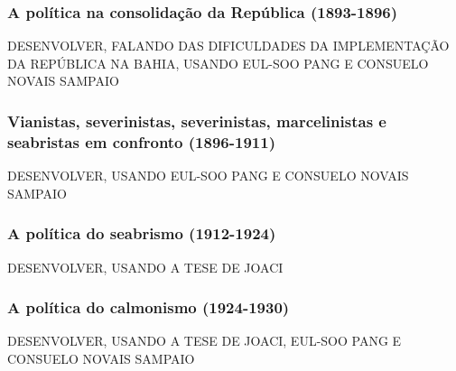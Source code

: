 \subsubsection{A política na consolidação da República (1893-1896)}

DESENVOLVER, FALANDO DAS DIFICULDADES DA IMPLEMENTAÇÃO DA REPÚBLICA NA BAHIA, USANDO EUL-SOO PANG E CONSUELO NOVAIS SAMPAIO

\subsubsection{Vianistas, severinistas, severinistas, marcelinistas e seabristas em confronto (1896-1911)}

DESENVOLVER, USANDO EUL-SOO PANG E CONSUELO NOVAIS SAMPAIO

\subsubsection{A política do seabrismo (1912-1924)}

DESENVOLVER, USANDO A TESE DE JOACI

\subsubsection{A política do calmonismo (1924-1930)}

DESENVOLVER, USANDO A TESE DE JOACI, EUL-SOO PANG E CONSUELO NOVAIS SAMPAIO